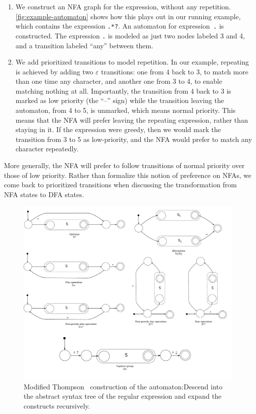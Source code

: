 \documentclass[english]{sigplanconf}
\theoremstyle{definition}
\begin{document}
\begin{enumerate}
\item We construct an NFA graph for the expression, without any
repetition.  \autoref{fig:example-automaton} shows how this plays
out in our running example, which contains the expression \texttt{.*?}.
An automaton for expression~\texttt{.} is constructed. The expression
\texttt{.} is modeled as just two nodes labeled 3 and 4, and a
transition labeled ``any'' between them.

\item We add prioritized transitions to model repetition. In our
example, repeating is achieved by adding two $\varepsilon$ transitions:
one from 4 back to 3, to match more than one time any character,
and another one from 3 to 4, to enable matching nothing at all.
Importantly, the transition from 4 back to 3 is marked as low
priority (the ``--'' sign) while the transition leaving the automaton,
from 4 to 5, is unmarked, which means normal priority.  This means
that the NFA will prefer leaving the repeating expression, rather
than staying in it.  If the expression were greedy, then we would
mark the transition from 3 to 5 as low-priority, and the NFA would
prefer to match any character repeatedly.

\end{enumerate}

More generally, the NFA will prefer to follow transitions of normal
priority over those of low priority. Rather than formalize this
notion of preference on NFAs, we come back to prioritized transitions when
discussing the transformation from NFA states to DFA states.

\begin{figure}[tb] \includegraphics[width=\linewidth]{graphs/thompson}
\caption{Modified Thompson~\cite{Thom68a} construction of the
automaton:Descend into the abstract syntax tree of the regular
expression and expand the constructs recursively.}
\label{fig:thompson-construction} 
\end{figure}
\end{document}
